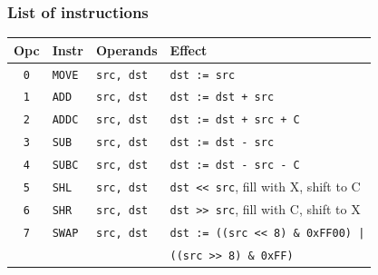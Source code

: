 \documentclass{beamer}
\begin{document}
%
   \begin{frame}
    \frametitle{List of instructions}
    \begin{center}
     \begin{tabular}{|c|ll|l|}
      \hline
       Opc&Instr&Operands&Effect\\
      \hline
       {\tt 0}&{\tt MOVE}&{\tt src, dst}&{\tt dst := src}\\
       {\tt 1}&{\tt ADD}&{\tt src, dst}&{\tt dst := dst + src}\\
       {\tt 2}&{\tt ADDC}&{\tt src, dst}&{\tt dst := dst + src + C}\\
       {\tt 3}&{\tt SUB}&{\tt src, dst}&{\tt dst := dst - src}\\
       {\tt 4}&{\tt SUBC}&{\tt src, dst}&{\tt dst := dst - src - C}\\
       {\tt 5}&{\tt SHL}&{\tt src, dst}&{\tt dst << src}, fill with X, shift to C\\
       {\tt 6}&{\tt SHR}&{\tt src, dst}&{\tt dst >> src}, fill with C, shift to X\\
       {\tt 7}&{\tt SWAP}&{\tt src, dst}&{\tt dst := ((src << 8) \& 0xFF00) |}\\
              &          &              &{\tt ((src >> 8) \& 0xFF)}\\
      \hline
     \end{tabular}
    \end{center}
   \end{frame}
%
\end{document}
